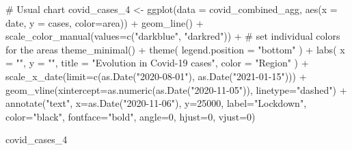 \documentclass[
  letterpaper,
  DIV=11,
  numbers=noendperiod]{scrreprt}
\newenvironment{Shaded}{\begin{snugshade}}{\end{snugshade}}
\newcommand{\AttributeTok}[1]{\textcolor[rgb]{0.40,0.45,0.13}{#1}}
\newcommand{\CommentTok}[1]{\textcolor[rgb]{0.37,0.37,0.37}{#1}}
\newcommand{\DecValTok}[1]{\textcolor[rgb]{0.68,0.00,0.00}{#1}}
\newcommand{\FunctionTok}[1]{\textcolor[rgb]{0.28,0.35,0.67}{#1}}
\newcommand{\NormalTok}[1]{\textcolor[rgb]{0.00,0.23,0.31}{#1}}
\newcommand{\OtherTok}[1]{\textcolor[rgb]{0.00,0.23,0.31}{#1}}
\newcommand{\SpecialCharTok}[1]{\textcolor[rgb]{0.37,0.37,0.37}{#1}}
\newcommand{\StringTok}[1]{\textcolor[rgb]{0.13,0.47,0.30}{#1}}
\begin{document}
\begin{Shaded}
\begin{Highlighting}[]
\CommentTok{\# Usual chart}
\NormalTok{covid\_cases\_4 }\OtherTok{\textless{}{-}} \FunctionTok{ggplot}\NormalTok{(}\AttributeTok{data =}\NormalTok{ covid\_combined\_agg, }\FunctionTok{aes}\NormalTok{(}\AttributeTok{x =}\NormalTok{ date, }\AttributeTok{y =}\NormalTok{ cases, }\AttributeTok{color=}\NormalTok{area)) }\SpecialCharTok{+}
  \FunctionTok{geom\_line}\NormalTok{() }\SpecialCharTok{+} 
  \FunctionTok{scale\_color\_manual}\NormalTok{(}\AttributeTok{values=}\FunctionTok{c}\NormalTok{(}\StringTok{"darkblue"}\NormalTok{, }\StringTok{"darkred"}\NormalTok{)) }\SpecialCharTok{+} \CommentTok{\# set individual colors for the areas}
  \FunctionTok{theme\_minimal}\NormalTok{() }\SpecialCharTok{+}
  \FunctionTok{theme}\NormalTok{(}
    \AttributeTok{legend.position =} \StringTok{"bottom"}
\NormalTok{  ) }\SpecialCharTok{+}
  \FunctionTok{labs}\NormalTok{(}
    \AttributeTok{x =} \StringTok{""}\NormalTok{,}
    \AttributeTok{y =} \StringTok{""}\NormalTok{,}
    \AttributeTok{title =} \StringTok{"Evolution in Covid{-}19 cases"}\NormalTok{,}
    \AttributeTok{color =} \StringTok{"Region"}
\NormalTok{  ) }\SpecialCharTok{+}
  \FunctionTok{scale\_x\_date}\NormalTok{(}\AttributeTok{limit=}\FunctionTok{c}\NormalTok{(}\FunctionTok{as.Date}\NormalTok{(}\StringTok{"2020{-}08{-}01"}\NormalTok{), }\FunctionTok{as.Date}\NormalTok{(}\StringTok{"2021{-}01{-}15"}\NormalTok{))) }\SpecialCharTok{+}
 \FunctionTok{geom\_vline}\NormalTok{(}\AttributeTok{xintercept=}\FunctionTok{as.numeric}\NormalTok{(}\FunctionTok{as.Date}\NormalTok{(}\StringTok{"2020{-}11{-}05"}\NormalTok{)), }\AttributeTok{linetype=}\StringTok{"dashed"}\NormalTok{) }\SpecialCharTok{+}
  \FunctionTok{annotate}\NormalTok{(}\StringTok{"text"}\NormalTok{, }\AttributeTok{x=}\FunctionTok{as.Date}\NormalTok{(}\StringTok{"2020{-}11{-}06"}\NormalTok{), }\AttributeTok{y=}\DecValTok{25000}\NormalTok{, }\AttributeTok{label=}\StringTok{"Lockdown"}\NormalTok{, }
           \AttributeTok{color=}\StringTok{"black"}\NormalTok{, }\AttributeTok{fontface=}\StringTok{"bold"}\NormalTok{, }\AttributeTok{angle=}\DecValTok{0}\NormalTok{, }\AttributeTok{hjust=}\DecValTok{0}\NormalTok{, }\AttributeTok{vjust=}\DecValTok{0}\NormalTok{)}

\NormalTok{covid\_cases\_4}
\end{Highlighting}
\end{Shaded}
\end{document}

